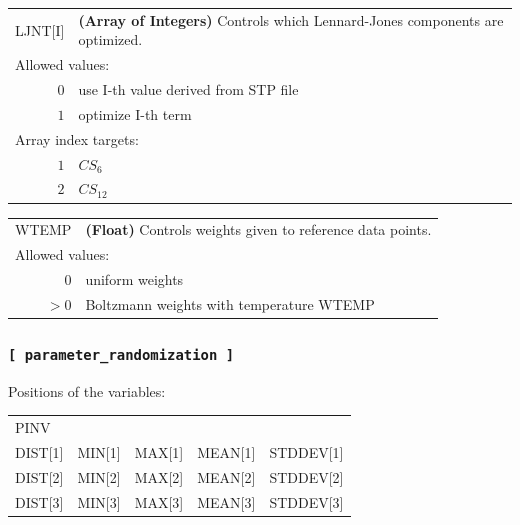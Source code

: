\documentclass[10pt,a4paper]{report}
\numberwithin{equation}{section}
\begin{document}
{
\begin{tabular}{r@{ : }l}
\label{descr:ljnt}
      LJNT[I]&\textbf{(Array of Integers)} Controls which Lennard-Jones components are optimized.                                               \\ 
\multicolumn{2}{l}{Allowed values:} \\ 
     \(0\)&use I-th value derived from STP file                                                                         \\ 
     \(1\)&optimize I-th term                                                                                   \\ 
\multicolumn{2}{l}{Array index targets:} \\ 
     \(1\)&$CS_6$                                                                                 \\ 
     \(2\)&$CS_{12}$                                                                            \\ 
\end{tabular}
\vspace{1ex}
}

{
\begin{tabular}{r@{ : }l}
\label{descr:wtemp}
     WTEMP&\textbf{(Float)} Controls weights given to reference data points.                                                     \\ 
\multicolumn{2}{l}{Allowed values:} \\ 
     \(0\)&uniform weights                                                                                      \\ 
    \(>0\)&Boltzmann weights with temperature WTEMP                                                             \\ 
\end{tabular}
\vspace{1ex}
}

\subsubsection{\texttt{[~parameter\_randomization~]}}
\label{sec:inp-parameter_randomization}

Positions of the variables:
\begin{center}
  \begin{tabular}{lllll}
    PINV&&&& \\
    DIST[1]&MIN[1]&MAX[1]&MEAN[1]&STDDEV[1] \\
    DIST[2]&MIN[2]&MAX[2]&MEAN[2]&STDDEV[2] \\
    DIST[3]&MIN[3]&MAX[3]&MEAN[3]&STDDEV[3] \\
  \end{tabular}
\end{center}
\end{document}
